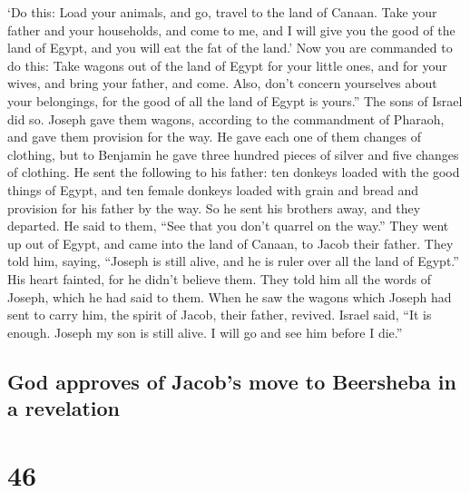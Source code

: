 `Do this: Load your animals, and go, travel to the land of Canaan.
 Take your father and your households, and come to me,
and I will give you the good of the land of Egypt, and you will eat the
fat of the land.'  Now you are commanded to do this: Take
wagons out of the land of Egypt for your little ones, and for your
wives, and bring your father, and come.  Also, don't
concern yourselves about your belongings, for the good of all the land
of Egypt is yours.''  The sons of Israel did so. Joseph
gave them wagons, according to the commandment of Pharaoh, and gave them
provision for the way.  He gave each one of them changes
of clothing, but to Benjamin he gave three hundred pieces of silver and
five changes of clothing.  He sent the following to his
father: ten donkeys loaded with the good things of Egypt, and ten female
donkeys loaded with grain and bread and provision for his father by the
way.  So he sent his brothers away, and they departed. He
said to them, ``See that you don't quarrel on the way.'' 
They went up out of Egypt, and came into the land of Canaan, to Jacob
their father.  They told him, saying, ``Joseph is still
alive, and he is ruler over all the land of Egypt.'' His heart fainted,
for he didn't believe them.  They told him all the words
of Joseph, which he had said to them. When he saw the wagons which
Joseph had sent to carry him, the spirit of Jacob, their father,
revived.  Israel said, ``It is enough. Joseph my son is
still alive. I will go and see him before I die.''

\hypertarget{god-approves-of-jacobs-move-to-beersheba-in-a-revelation}{%
\subsection{God approves of Jacob's move to Beersheba in a
revelation}\label{god-approves-of-jacobs-move-to-beersheba-in-a-revelation}}

\hypertarget{section-45}{%
\section{46}\label{section-45}}

